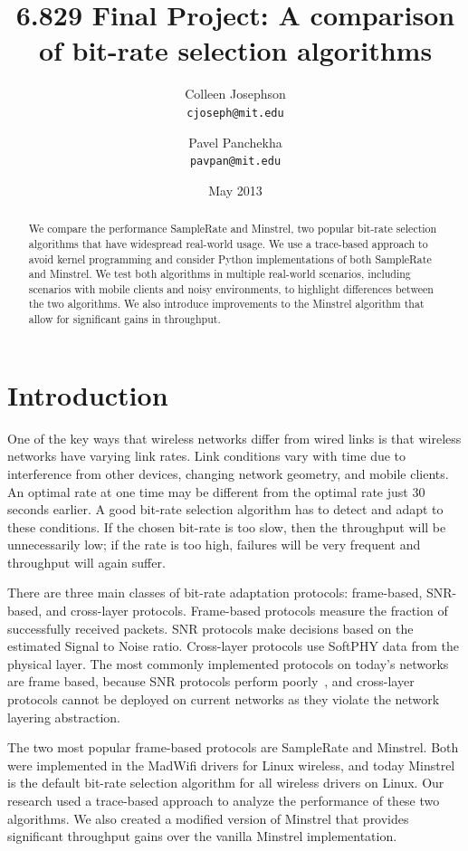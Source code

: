 \documentclass[twocolumn,10pt]{article}
\title{6.829 Final Project: A comparison of bit-rate selection algorithms}
\author{Colleen Josephson \\ \texttt{cjoseph@mit.edu}
  \and Pavel Panchekha \\ \texttt{pavpan@mit.edu}}
\date{May 2013}
\begin{document}
\maketitle

\begin{abstract}
We compare the performance SampleRate and Minstrel, two popular
bit-rate selection algorithms that have widespread real-world usage.
We use a trace-based approach to avoid kernel programming and consider
Python implementations of both SampleRate and Minstrel.  We test both
algorithms in multiple real-world scenarios, including scenarios with
mobile clients and noisy environments, to highlight differences
between the two algorithms.  We also introduce improvements to the
Minstrel algorithm that allow for significant gains in throughput.
\end{abstract}

\section{Introduction}

One of the key ways that wireless networks differ from wired links is
that wireless networks have varying link rates.  Link conditions vary
with time due to interference from other devices, changing network
geometry, and mobile clients.  An optimal rate at one time may be
different from the optimal rate just 30 seconds earlier.  A good
bit-rate selection algorithm has to detect and adapt to these
conditions.  If the chosen bit-rate is too slow, then the throughput
will be unnecessarily low; if the rate is too high, failures will be
very frequent and throughput will again suffer.

There are three main classes of bit-rate adaptation protocols:
frame-based, SNR-based, and cross-layer protocols.  Frame-based
protocols measure the fraction of successfully received packets.  SNR
protocols make decisions based on the estimated Signal to Noise ratio.
Cross-layer protocols use SoftPHY data from the physical layer.  The
most commonly implemented protocols on today's networks are frame
based, because SNR protocols perform poorly~\cite{samplerate}, and
cross-layer protocols cannot be deployed on current networks as they
violate the network layering abstraction.

The two most popular frame-based protocols are SampleRate and
Minstrel.  Both were implemented in the MadWifi drivers for Linux
wireless, and today Minstrel is the default bit-rate selection
algorithm for all wireless drivers on Linux.  Our research used a
trace-based approach to analyze the performance of these two
algorithms.  We also created a modified version of Minstrel that
provides significant throughput gains over the vanilla Minstrel
implementation.
\end{document}
